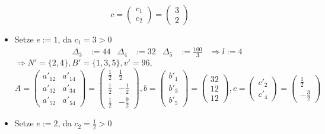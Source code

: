 \documentclass[a4paper,10pt]{article}
\begin{document}
\begin{enumerate}
\[        c = \begin{pmatrix}c_1 \\ c_2\end{pmatrix} 
        = \begin{pmatrix}3 \\ 2\end{pmatrix}
        \]
        \begin{itemize}
        \item   Setze $e := 1$, da $c_1 = 3 > 0$
                \begin{align*}
                    \Delta_3 &:= 44 & \Delta_4 &:= 32 & \Delta_5 &:= \frac{100}{3} & \Rightarrow l := 4
                \end{align*}
                $\Rightarrow N' = \{2,4\}, B' = \{1,3,5\}, v' = 96,$
                \[
                A = \begin{pmatrix}
                        a'_{12} & a'_{14} \\
                        a'_{32} & a'_{34} \\
                        a'_{52} & a'_{54}
                    \end{pmatrix}
                = \begin{pmatrix}
                        \frac{1}{2} &  \frac{1}{2} \\
                        \frac{1}{2} & -\frac{1}{2} \\
                        \frac{1}{2} & -\frac{9}{2}
                    \end{pmatrix}, 
                b = \begin{pmatrix}b'_1 \\ b'_3 \\ b'_5 \end{pmatrix} 
                = \begin{pmatrix}32 \\ 12 \\ 12\end{pmatrix},
                c = \begin{pmatrix}c'_2 \\ c'_4\end{pmatrix} 
                = \begin{pmatrix}\frac{1}{2} \\ -\frac{3}{2}\end{pmatrix}
                \]
        \item   Setze $e := 2$, da $c_2 = \frac{1}{2} > 0$
                \begin{align*}

\end{align*}
\end{itemize}
\end{enumerate}
\end{document}
